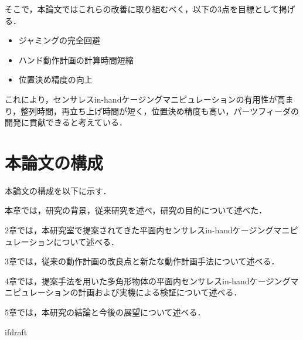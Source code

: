\documentclass[a4paper,twoside,12pt,papersize, dvipdfmx]{iirthesis}
\begin{document}
そこで，本論文ではこれらの改善に取り組むべく，以下の3点を目標として掲げる．
\begin{itemize}
\item ジャミングの完全回避
\item ハンド動作計画の計算時間短縮
\item 位置決め精度の向上
\end{itemize}
これにより，センサレスin-handケージングマニピュレーションの有用性が高まり，整列時間，再立ち上げ時間が短く，位置決め精度も高い，パーツフィーダの開発に貢献できると考えている．

\section{本論文の構成}\label{sec::intro::configuration}
本論文の構成を以下に示す．\par
本章では，研究の背景，従来研究を述べ，研究の目的について述べた．\par
2章では，本研究室で提案されてきた平面内センサレスin-handケージングマニピュレーションについて述べる．\par
3章では，従来の動作計画の改良点と新たな動作計画手法について述べる．\par
4章では，提案手法を用いた多角形物体の平面内センサレスin-handケージングマニピュレーションの計画および実機による検証について述べる．\par
5章では，本研究の結論と今後の展望について述べる．


\expandafter\ifx\csname ifdraft\endcsname\relax
    
\end{document}
